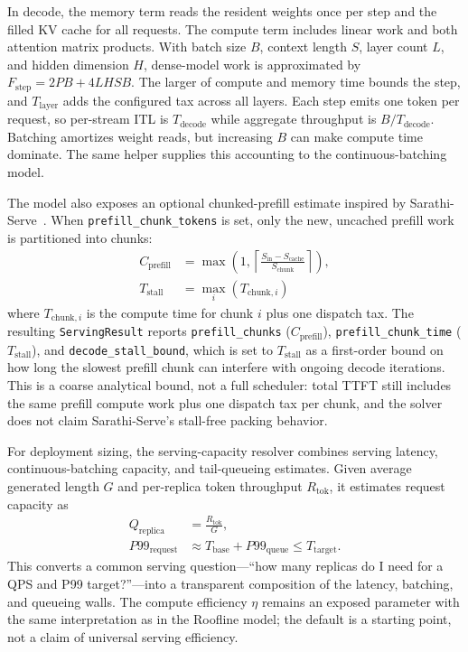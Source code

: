 \documentclass[10pt,twocolumn]{article}
\begin{document}
In decode, the memory term reads the resident weights once per step and the filled KV cache for all requests. The compute term includes linear work and both attention matrix products. With batch size $B$, context length $S$, layer count $L$, and hidden dimension $H$, dense-model work is approximated by $F_{\text{step}}=2PB+4LHSB$. The larger of compute and memory time bounds the step, and $T_{\text{layer}}$ adds the configured tax across all layers. Each step emits one token per request, so per-stream ITL is $T_{\text{decode}}$ while aggregate throughput is $B/T_{\text{decode}}$. Batching amortizes weight reads, but increasing $B$ can make compute time dominate. The same helper supplies this accounting to the continuous-batching model.

The model also exposes an optional chunked-prefill estimate inspired by Sarathi-Serve~\citep{agrawal2025}. When \texttt{prefill\_chunk\_tokens} is set, only the new, uncached prefill work is partitioned into chunks:
\begin{align}
\label{eq:chunked-prefill}
C_{\text{prefill}} &=
\max\!\left(1,\left\lceil\frac{S_{\text{in}} - S_{\text{cache}}}{S_{\text{chunk}}}\right\rceil\right), \\
T_{\text{stall}} &= \max_i\left(T_{\text{chunk},i}\right)
\end{align}
where $T_{\text{chunk},i}$ is the compute time for chunk $i$ plus one dispatch tax. The resulting \texttt{ServingResult} reports \texttt{prefill\_chunks} ($C_{\text{prefill}}$), \texttt{prefill\_chunk\_time} ($T_{\text{stall}}$), and \texttt{decode\_stall\_bound}, which is set to $T_{\text{stall}}$ as a first-order bound on how long the slowest prefill chunk can interfere with ongoing decode iterations. This is a coarse analytical bound, not a full scheduler: total TTFT still includes the same prefill compute work plus one dispatch tax per chunk, and the solver does not claim Sarathi-Serve's stall-free packing behavior.

For deployment sizing, the serving-capacity resolver combines serving latency, continuous-batching capacity, and tail-queueing estimates. Given average generated length $G$ and per-replica token throughput $R_{\text{tok}}$, it estimates request capacity as
\begin{align}
\label{eq:serving-capacity}
Q_{\text{replica}} &= \frac{R_{\text{tok}}}{G}, \\
P99_{\text{request}} &\approx T_{\text{base}} + P99_{\text{queue}} \le T_{\text{target}}.
\end{align}
This converts a common serving question---``how many replicas do I need for a QPS and P99 target?''---into a transparent composition of the latency, batching, and queueing walls. The compute efficiency $\eta$ remains an exposed parameter with the same interpretation as in the Roofline model; the default is a starting point, not a claim of universal serving efficiency.
\end{document}
